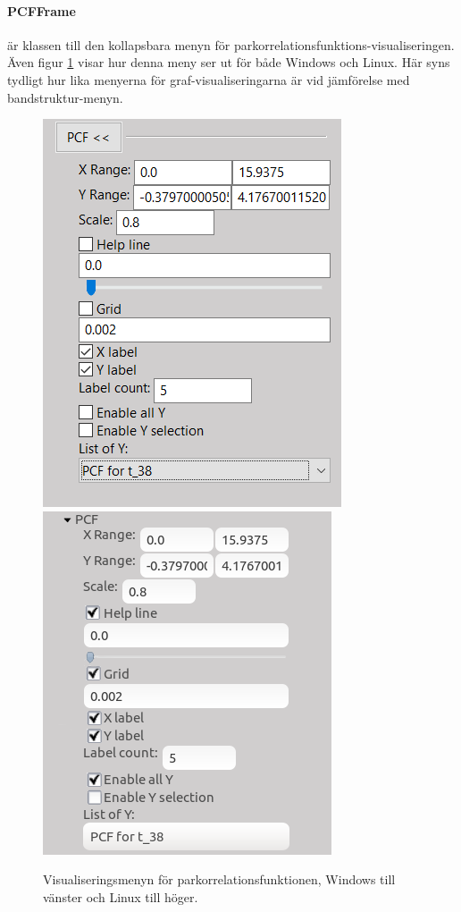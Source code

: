 \paragraph{PCFFrame} är klassen till den kollapsbara menyn för parkorrelationsfunktions-visualiseringen. Även figur \ref{fig:GUIPCF} visar hur denna meny ser ut för både Windows och Linux. Här syns tydligt hur lika menyerna för graf-visualiseringarna är vid jämförelse med bandstruktur-menyn.

\begin{figure}[H]
  \centering
    \includegraphics[scale=0.5]{images/GUI/GUIPCFWin.png}
    \includegraphics[scale=0.565]{images/GUI/GUIPCFLinux.png}
    \caption{Visualiseringsmenyn för parkorrelationsfunktionen, Windows till vänster och Linux till höger.}
    \label{fig:GUIPCF}
\end{figure}

